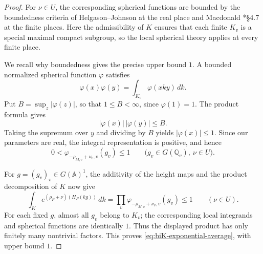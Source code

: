\documentclass[12pt]{amsart}
\theoremstyle{definition}
\theoremstyle{plain}
\theoremstyle{remark}
\def\A{\mathbb{A}}%
\numberwithin{equation}{section}
\begin{document}
\begin{proof}
For $\nu\in U$, the corresponding spherical functions
are bounded by the boundedness criteria of
Helgason--Johnson \cite{HJ69} at the real place and
Macdonald \cite{Mac71}*{\S4.7} at the finite places.
Here the admissibility of $K$ ensures that each finite
$K_v$ is a special maximal compact subgroup, so the
local spherical theory applies at every finite place.

We recall why boundedness gives the precise upper bound $1$.
A bounded normalized spherical function $\varphi$ satisfies
\[
 \varphi(x)\varphi(y)
 =\int_{K_v}\varphi(xky)\,dk.
\]
Put $B=\sup_z|\varphi(z)|$, so that $1\le B<\infty$, since $\varphi(1)=1$.
The product formula gives
\[
 |\varphi(x)|\,|\varphi(y)|\le B.
\]
Taking the supremum over $y$ and dividing by $B$ yields $|\varphi(x)|\le 1$. 
Since our parameters are real, the integral representation is positive, and hence
\[
 0<
 \varphi_{-\rho_{M,v}+\nu_v,v}(g_v)
 \le1
 \qquad
 \bigl(g_v\in G(\mathbb Q_v),\ \nu\in U\bigr).
\]


For $g=(g_v)_v\in G(\A)^1$, the additivity of the height maps and the product decomposition of $K$ now give
\[
 \int_K e^{(\rho_P+\nu)(H_P(kg))}\,dk
 =
 \prod_v\varphi_{-\rho_{M,v}+\nu_v,v}(g_v)
 \le1
 \qquad(\nu\in U).
\]
For each fixed $g$, almost all $g_v$ belong to $K_v$;
the corresponding local integrands and spherical functions
are identically $1$.
Thus the displayed product has only finitely many
nontrivial factors.
This proves \eqref{eq:biK-exponential-average}, with upper bound $1$.
\end{proof}
\end{document}
